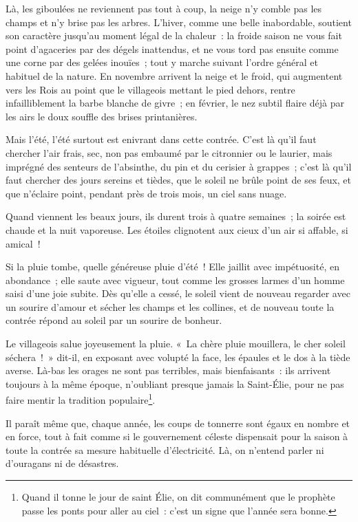 \documentclass[french,twoside]{book} %
\begin{document}
Là, les giboulées ne reviennent pas tout à coup, la neige n’y comble pas les champs et n’y brise pas les arbres. L’hiver, comme une belle inabordable, soutient son caractère jusqu’au moment légal de la chaleur : la froide saison ne vous fait point d’agaceries par des dégels inattendus, et ne vous tord pas ensuite comme une corne par des gelées inouïes ; tout y marche suivant l’ordre général et habituel de la nature. En novembre arrivent la neige et le froid, qui augmentent vers les Rois au point que le villageois mettant le pied dehors, rentre infailliblement la barbe blanche de givre ; en février, le nez subtil flaire déjà par les airs le doux souffle des brises printanières.\par
Mais l’été, l’été surtout est enivrant dans cette contrée. C’est là qu’il faut chercher l’air frais, sec, non pas embaumé par le citronnier ou le laurier, mais imprégné des senteurs de l’absinthe, du pin et du cerisier à grappes ; c’est là qu’il faut chercher des jours sereins et tièdes, que le soleil ne brûle point de ses feux, et que n’éclaire point, pendant près de trois mois, un ciel sans nuage.\par
Quand viennent les beaux jours, ils durent trois à quatre semaines ; la soirée est chaude et la nuit vaporeuse. Les étoiles clignotent aux cieux d’un air si affable, si amical !\par
Si la pluie tombe, quelle généreuse pluie d’été ! Elle jaillit avec impétuosité, en abondance ; elle saute avec vigueur, tout comme les grosses larmes d’un homme saisi d’une joie subite. Dès qu’elle a cessé, le soleil vient de nouveau regarder avec un sourire d’amour et sécher les champs et les collines, et de nouveau toute la contrée répond au soleil par un sourire de bonheur.\par
Le villageois salue joyeusement la pluie. « La chère pluie mouillera, le cher soleil séchera ! » dit-il, en exposant avec volupté la face, les épaules et le dos à la tiède averse. Là-bas les orages ne sont pas terribles, mais bienfaisants : ils arrivent toujours à la même époque, n’oubliant presque jamais la Saint-Élie, pour ne pas faire mentir la tradition populaire\footnote{Quand il tonne le jour de saint Élie, on dit communément que le prophète passe les ponts pour aller au ciel : c’est un signe que l’année sera bonne.}.\par
Il paraît même que, chaque année, les coups de tonnerre sont égaux en nombre et en force, tout à fait comme si le gouvernement céleste dispensait pour la saison à toute la contrée sa mesure habituelle d’électricité. Là, on n’entend parler ni d’ouragans ni de désastres.\par
\end{document}
